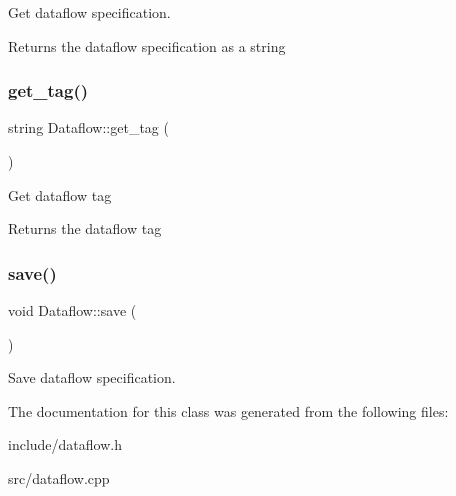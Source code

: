 Get dataflow specification. \begin{DoxyReturn}{Returns}
the dataflow specification as a string 
\end{DoxyReturn}
\mbox{\label{classDataflow_a0d4fcfeba2d4fe22283c925d22eca17d}} 
\subsubsection{\texorpdfstring{get\+\_\+tag()}{get\_tag()}}
{\footnotesize\ttfamily string Dataflow\+::get\+\_\+tag (\begin{DoxyParamCaption}{ }\end{DoxyParamCaption})}

Get dataflow tag \begin{DoxyReturn}{Returns}
the dataflow tag 
\end{DoxyReturn}
\mbox{\label{classDataflow_a91f7c9eaf26223ff4c1da5f34fedb7be}} 
\subsubsection{\texorpdfstring{save()}{save()}}
{\footnotesize\ttfamily void Dataflow\+::save (\begin{DoxyParamCaption}{ }\end{DoxyParamCaption})}

Save dataflow specification. 

The documentation for this class was generated from the following files\+:\begin{DoxyCompactItemize}
\item 
include/dataflow.\+h\item 
src/dataflow.\+cpp\end{DoxyCompactItemize}
